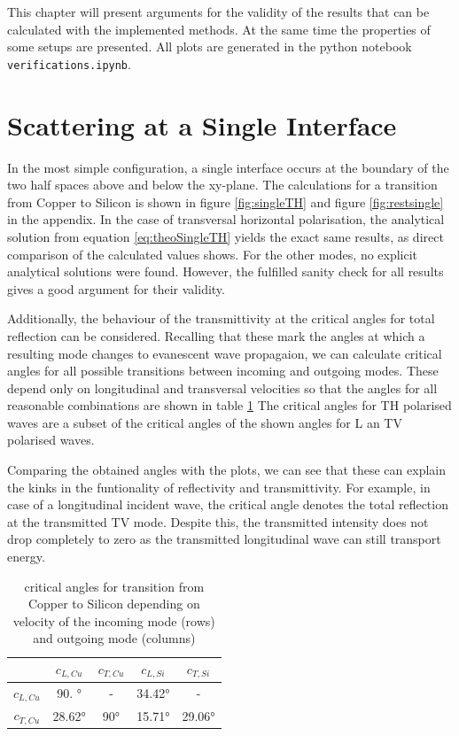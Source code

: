 This chapter will present arguments for the validity of the results that can be
calculated with the implemented methods. At the same time the properties of
some setups are presented. All plots are generated in the
python notebook \texttt{verifications.ipynb}.

\section{Scattering at a Single Interface}
In the most simple configuration, a single interface occurs at the boundary of
the two half spaces above and below the xy-plane.
The calculations for a transition from Copper to Silicon is shown in figure
\ref{fig:singleTH} and figure \ref{fig:restsingle} in the appendix. In the case
of transversal horizontal polarisation, the analytical solution from equation
\ref{eq:theoSingleTH} yields the exact same results, as direct comparison of
the calculated values shows. For the other modes, no explicit analytical
solutions were found. However, the fulfilled sanity check for all results
gives a good argument for their validity.

Additionally, the behaviour of the transmittivity at the critical angles for
total reflection can be considered. Recalling that these mark the angles at
which a resulting mode changes to evanescent wave propagaion, we can calculate
critical angles for all possible transitions between incoming and outgoing
modes. These depend only on longitudinal and transversal velocities so that
the angles for all reasonable combinations are shown in table
\ref{tab:critangles}
The critical angles for TH polarised waves are a subset of the critical angles
of the shown angles for L an TV polarised waves.

Comparing the obtained angles with the plots, we can see that these can explain
the kinks in the funtionality of reflectivity and transmittivity. For example,
in case of a longitudinal incident wave, the critical angle denotes the total
reflection at the transmitted TV mode. Despite this, the transmitted intensity
does not drop completely to zero as the transmitted longitudinal wave can still
transport energy.
\begin{table}[t]
    \centering
    \begin{tabular}{c||c|c|c|c}
                   & $c_{L,Cu}$  & $c_{T,Cu}$ & $c_{L,Si}$  & $c_{T,Si}$
        \\ \hline
        $c_{L,Cu}$ & \ang{90. }  & -          & \ang{34.42} & -
        \\
        $c_{T,Cu}$ & \ang{28.62} & \ang{90}   & \ang{15.71} & \ang{29.06}
    \end{tabular}
    \caption{critical angles for transition from Copper to Silicon depending on
        velocity of the incoming mode (rows) and outgoing mode (columns)}
    \label{tab:critangles}
\end{table}

